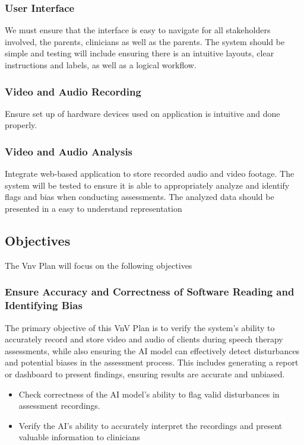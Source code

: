 \documentclass[12pt, titlepage]{article}
\begin{document}
  \subsubsection{User Interface}

  We must ensure that the interface is easy to navigate for all stakeholders involved, the parents, 
  clinicians as well as the parents. The system should be simple and testing will include ensuring 
  there is an intuitive layouts, clear instructions and labels, as well as a logical workflow.

  \subsubsection{Video and Audio Recording}

  Ensure set up of hardware devices used on application is intuitive and done properly. 

  \subsubsection{Video and Audio Analysis}

  Integrate web-based application to store recorded audio and video footage. The system will be tested to ensure it is able to 
  appropriately analyze and identify flags and bias when conducting assessments. The analyzed data should be presented 
  in a easy to understand representation

\subsection{Objectives}


The Vnv Plan will focus on the following objectives
\subsubsection{Ensure Accuracy and Correctness of Software Reading and Identifying Bias}
The primary objective of this VnV Plan is to verify the system's ability to accurately record 
and store video and audio of clients during speech therapy assessments, while also ensuring the AI model can 
effectively detect disturbances and potential biases in the assessment process. This includes generating 
a report or dashboard to present findings, ensuring results are accurate and unbiased.

\begin{itemize}
  \item Check correctness of the AI model's ability to flag valid disturbances in assessment recordings.
  \item Verify the AI's ability to accurately interpret the recordings and present valuable information to clinicians
\end{itemize}
\end{document}
